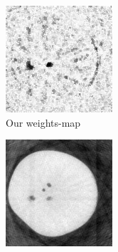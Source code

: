 \documentclass{article}
\begin{document}
\begin{figure}[!h]
    \begin{subfigure}[b]{0.4\linewidth}
        \includegraphics[width=\textwidth]{../images/comparison_lit/weightsIm_all_methods30.png}
        \caption{Our weights-map}
    \end{subfigure}
   \quad
        \begin{subfigure}[b]{0.4\linewidth}
        \includegraphics[width=\textwidth]{../images/comparison_lit/weighted_pca_all_methods30.png}

\end{subfigure}
\end{figure}
\end{document}
